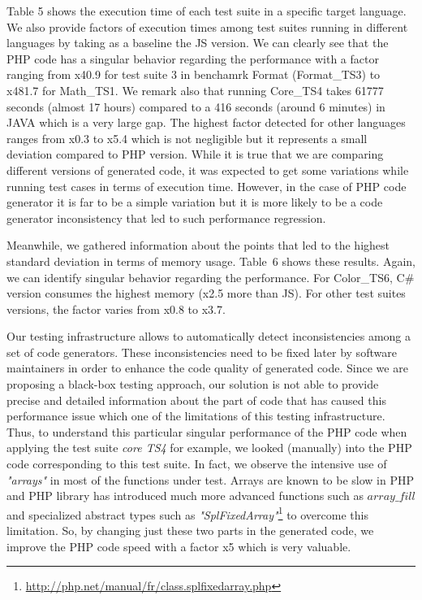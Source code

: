 Table 5 shows the execution time of each test suite in a specific target language. We also provide factors of execution times among test suites running in different languages by taking as a baseline the JS version. 
We can clearly see that the PHP code has a singular behavior regarding the performance with a factor ranging from x40.9 for test suite 3 in benchamrk Format (Format\_TS3) to x481.7 for Math\_TS1. We remark also that running Core\_TS4 takes 61777 seconds (almost 17 hours) compared to a 416 seconds (around 6 minutes) in JAVA which is a very large gap. The highest factor detected for other languages ranges from x0.3 to x5.4 which is not negligible but it represents a small deviation compared to PHP version. While it is true that we are comparing different versions of generated code, it was expected to get some variations while running test cases in terms of execution time. However, in the case of PHP code generator it is far to be a simple variation but it is more likely to be a code generator inconsistency that led to such performance regression.


Meanwhile, we gathered information about the points that led to the highest standard deviation in terms of memory usage. Table~6 shows these results. %
Again, we can identify singular behavior regarding the performance. For Color\_TS6, C\# version consumes the highest memory (x2.5 more than JS). For other test suites versions, the factor varies from x0.8 to x3.7. %

Our testing infrastructure allows to automatically detect inconsistencies among a set of code generators. These inconsistencies need to be fixed later by software maintainers in order to enhance the code quality of generated code. Since we are proposing a black-box testing approach, our solution is not able to provide precise and detailed information about the part of code that has caused this performance issue which one of the limitations of this testing infrastructure.
Thus, to understand this particular singular performance of the PHP code when applying the test suite \textit{core TS4} for example, we looked (manually) into the PHP code corresponding to this test suite. In fact, we observe the intensive use of \textit{"arrays"} in most of the functions under test. Arrays are known to be slow in PHP and PHP library has introduced much more advanced functions such as $array\_fill$ and specialized abstract types such as \textit{"SplFixedArray"}\footnote{\url{http://php.net/manual/fr/class.splfixedarray.php}} to overcome this limitation. So, by changing just these two parts in the generated code, we improve the PHP code speed with a factor x5 which is very valuable. 



